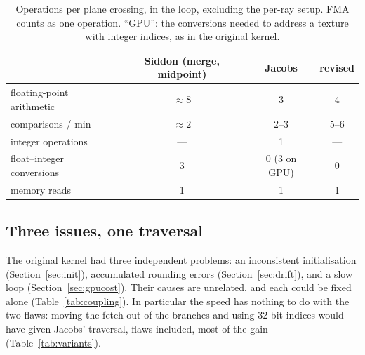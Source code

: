 \documentclass[11pt,a4paper]{article}
\theoremstyle{remark}
\begin{document}
\begin{table}[h]
\centering
\caption{\label{tab:flops}Operations per plane crossing, in the loop, excluding the per-ray setup.
FMA counts as one operation. ``GPU'': the conversions needed to address a texture with integer indices,
as in the original kernel.}
\begin{tabular}{lccc}
\toprule
& Siddon (merge, midpoint) & Jacobs & revised\\
\midrule
floating-point arithmetic & $\approx8$ & 3 & 4\\
comparisons / min        & $\approx2$ & 2--3 & 5--6\\
integer operations        & --- & 1 & ---\\
float--integer conversions & 3 & 0 (3 on GPU) & 0\\
memory reads              & 1 & 1 & 1\\
\bottomrule
\end{tabular}
\end{table}

\subsection{Three issues, one traversal}
\label{sec:coupling}

The original kernel had three independent problems: an inconsistent initialisation
(Section~\ref{sec:init}), accumulated rounding errors (Section~\ref{sec:drift}), and a slow loop
(Section~\ref{sec:gpucost}). Their causes are unrelated, and each could be fixed alone
(Table~\ref{tab:coupling}). In particular the speed has nothing to do with the two flaws: moving the fetch out
of the branches and using 32-bit indices would have given Jacobs' traversal, flaws included, most of the gain
(Table~\ref{tab:variants}).
\end{document}

